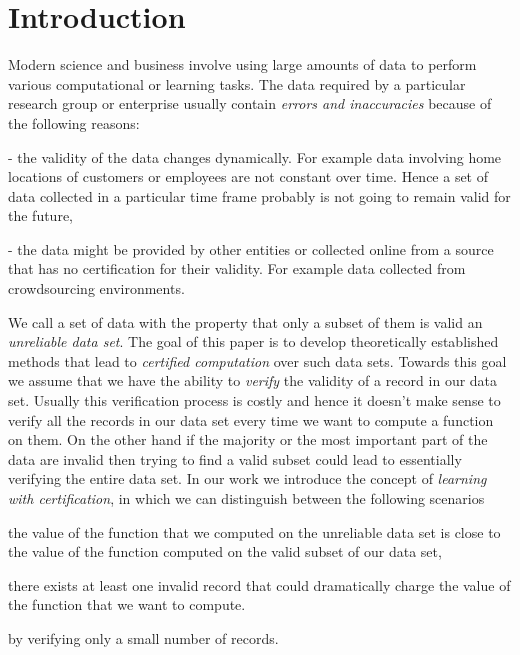 \section{Introduction}
\label{s:intro}

  Modern science and business involve using large amounts of data to perform various computational or learning tasks. The data required by a
particular research group or enterprise usually contain \textit{errors and inaccuracies} because of the following reasons:
\begin{CompactEnumerate}
  \item[-] the validity of the data changes dynamically. For example data involving home locations of customers or employees are
           not constant over time. Hence a set of data collected in a particular time frame probably is not going to remain valid for the
           future,
  \item[-] the data might be provided by other entities or collected online from a source that has no certification for their validity. For
           example data collected from crowdsourcing environments.
\end{CompactEnumerate}

\noindent We call a set of data with the property that only a subset of them is valid an \textit{unreliable data set}. The goal of this paper
is to develop theoretically established methods that lead to \textit{certified computation} over such data sets. Towards this goal we
assume that we have the  ability to \textit{verify} the validity of a record in our data set. Usually this verification process is costly and hence
it doesn't make sense to verify all the records in our data set every time we want to compute a function on them. On the other hand if the
majority or the most important part of the data are invalid then trying to find a valid subset could lead to essentially verifying the entire data set. In our work we introduce the concept of \textit{learning with certification}, in which we can distinguish between the following scenarios
\begin{CompactEnumerate}
  \item the value of the function that we computed on the unreliable data set is close to the value of the function computed on the valid
           subset of our data set,
  \item there exists at least one invalid record that could dramatically charge the value of the function that we want to compute.
\end{CompactEnumerate}
by verifying only a small number of records.
\smallskip

